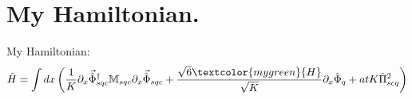 \chapter{My Hamiltonian.}
My Hamiltonian:
\begin{equation}
    \hat{H} = \int  dx \left ( \frac{1}{K} \partial_{x} \vec{\hat{\Phi}}_{sqc}^{\dagger} \mathbb{M}_{sqc} \partial_{x} \vec{\hat{\Phi}}_{sqc}   + \frac{\sqrt{6} \textcolor{mygreen}{H}}{\sqrt{K}} \partial_x \hat{\Phi}_{q} + atK \hat{\Pi}_{scq}^{2} \right)
\end{equation}